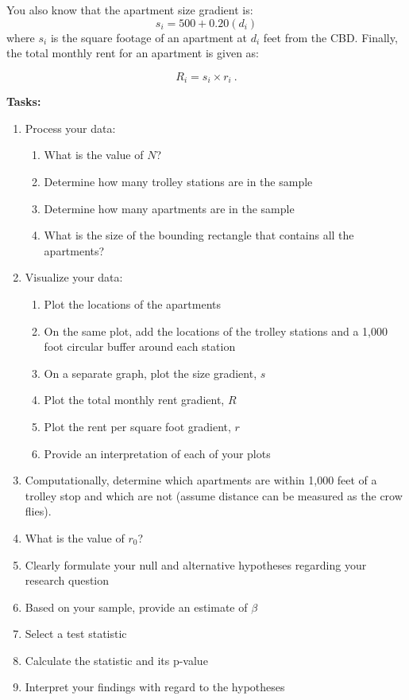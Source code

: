 \documentclass{article} %
\begin{document}
\vspace{.2in}
You also know that the apartment size gradient is:
\begin{equation}
  s_{i}=500+0.20 (d_i)
  \label{e:s}
\end{equation}
where $s_i$ is the square footage of an apartment at $d_i$ feet from the
CBD. Finally, the total monthly rent for an apartment is given as:

\begin{equation}
  R_i = s_i \times r_i \ .
  \label{e:R} 
\end{equation}



\vspace{.2in}

{\bf Tasks:} 
\begin{enumerate}
  \item Process your data:
    \begin{enumerate}
      \item What is the value of $N$?
      \item Determine how many trolley stations are in the sample
      \item Determine how many apartments are in the sample
      \item What is the size of the bounding rectangle that contains all the
      apartments?
    \end{enumerate}
  \item Visualize your data:
  \begin{enumerate}
    \item Plot the locations of the apartments
    \item On the same plot, add the locations of the trolley stations and a 1,000 foot circular
      buffer around each station
    \item On a separate graph, plot the size gradient, $s$
    \item Plot the total monthly rent gradient, $R$
    \item Plot the rent per square foot gradient, $r$
    \item Provide an interpretation of each of your plots
  \end{enumerate}
  \item Computationally, determine which apartments are within 1,000 feet of a trolley stop and
    which are not (assume distance can be measured as the crow flies).
  \item What is the value of $r_0$?
  \item Clearly formulate your null and alternative hypotheses regarding your
    research question
  \item Based on your sample, provide an estimate of $\beta$
  \item Select a test statistic
  \item Calculate the statistic and its p-value
  \item Interpret your findings with regard to the hypotheses
\end{enumerate}
\end{document}

